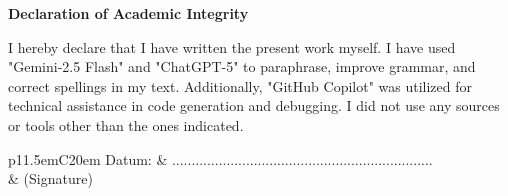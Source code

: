\documentclass[a4paper,11pt,openany]{book} %
\begin{document}
	\frontmatter

	
	
	\mainmatter
	
	\renewcommand{\baselinestretch}{1.05}
	\small\normalsize

	
	
	\newpage
	\thispagestyle{empty}
	\mbox{}
	\newpage

	
	
	\newpage
	\thispagestyle{empty}
	\mbox{}
	\newpage

	
	
	\newpage
	\thispagestyle{empty}
	\mbox{}
	\newpage

	
	
	\newpage
	\thispagestyle{empty}
	\mbox{}
	\newpage

	

	\newpage
	\thispagestyle{empty}
	\mbox{}
	\newpage

	

	\newpage
	\thispagestyle{empty}
	\mbox{}
	\newpage

	
	
	\newpage
	\thispagestyle{empty}
	\mbox{}
	\newpage

	

	\cleardoublepage
	\appendix
	
	
	\newpage
	\thispagestyle{empty}
	\mbox{}
	\newpage

	
	




\newpage
\thispagestyle{empty}
\begin{center}
	\vspace*{5em}
	\huge\textbf{Declaration of Academic Integrity}\\
\end{center}
\vspace{2em}
I hereby declare that I have written the present work myself. I have used "Gemini-2.5 Flash" and "ChatGPT-5" to paraphrase, improve grammar, and correct spellings in my text. Additionally, "GitHub Copilot" was utilized for technical assistance in code generation and debugging. I did not use any sources or tools other than the ones indicated.

\vspace{4em}
\begin{minipage}{\linewidth}
	\centering
	\begin{tabular}{p{11.5em}C{20em}}
		Datum: &  ...................................................................\\
		& \centering (Signature)\\
	\end{tabular}
\end{minipage}
\end{document}
